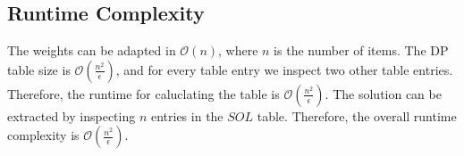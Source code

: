 \documentclass[12pt]{article}
\begin{document}
\subsection*{Runtime Complexity}
The weights can be adapted in $\mathcal{O}(n)$, where $n$ is the number of items. The DP table size is $\mathcal{O}(\frac{n^2}{\epsilon})$, and for every table entry we inspect two other table entries. Therefore, the runtime for caluclating the table is $\mathcal{O}(\frac{n^2}{\epsilon})$. The solution can be extracted by inspecting $n$ entries in the $\mathit{SOL}$ table. Therefore, the overall runtime complexity is $\mathcal{O}(\frac{n^2}{\epsilon})$.
\end{document}
